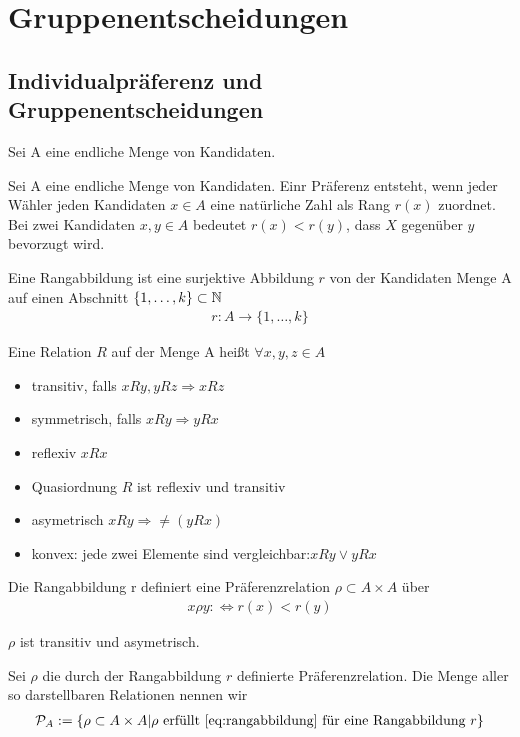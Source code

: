
\chapter{Gruppenentscheidungen}

\section{Individualpräferenz und Gruppenentscheidungen}

Sei A eine endliche Menge von Kandidaten.

\begin{defi}[Präferenz]
	Sei A eine endliche Menge von Kandidaten. Einr Präferenz entsteht, wenn jeder Wähler jeden Kandidaten $x \in A$ eine natürliche Zahl als Rang $r(x)$ zuordnet. Bei zwei Kandidaten $x, y \in A$ bedeutet $r(x)<r(y)$, dass $X$ gegenüber $y$ bevorzugt wird. 
\end{defi}

\begin{defi}[Rangabbildung]
	Eine Rangabbildung ist eine surjektive Abbildung $r$ von der Kandidaten Menge A auf einen Abschnitt $\{ 1, \dots, k \} \subset \mathbb{N} $ 
	\begin{align*}
		r:A \rightarrow \{ 1, \dots, k \} 
	\end{align*}
\end{defi}

\begin{defi}[Relation]
	Eine Relation $R$ auf der Menge A heißt $\forall x,y,z \in A$
	\begin{itemize}
		\item transitiv, falls $x Ry, yRz \Rightarrow xRz $
		\item symmetrisch, falls $xRy \Rightarrow yRx$
		\item reflexiv $xRx$
		\item Quasiordnung $R$ ist reflexiv und transitiv
		\item asymetrisch $xRy \Rightarrow \neq (yRx)$
		\item konvex: jede zwei Elemente sind vergleichbar:$xRy \vee yRx$
	\end{itemize}
\end{defi}

\begin{defi}[Präferenzrelation]
	Die Rangabbildung r definiert eine Präferenzrelation $\rho \subset A \times A$ über 
	\begin{align}
		\label{eq:rangabbildung}
		x \rho y : \Leftrightarrow r(x) < r(y)
	\end{align}
\end{defi}
$\rho$ ist transitiv und asymetrisch. 
\begin{defi}
	Sei $\rho$ die durch der Rangabbildung $r$ definierte Präferenzrelation.  
	Die Menge aller so darstellbaren Relationen nennen wir 
	\begin{align*}
		\mathcal{P}_A:=\{ \rho \subset A \times A| \rho \text{ erfüllt \eqref{eq:rangabbildung} für eine Rangabbildung } r  \}
	\end{align*}
\end{defi}

